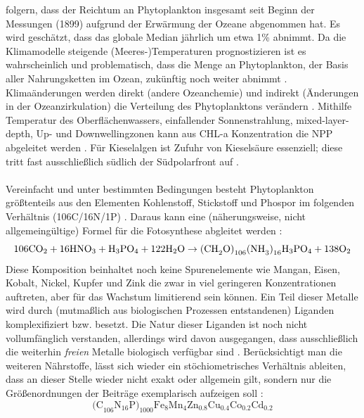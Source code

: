 \documentclass[12pt,a4paper,onecolumn]{scrartcl}
\newcommand{\cotwo}{CO\textsubscript{2}}
\begin{document}
\citet{Boyce.2010} folgern, dass der Reichtum an Phytoplankton insgesamt seit Beginn der Messungen (1899) aufgrund der Erwärmung der Ozeane abgenommen hat. Es wird geschätzt, dass das globale Median jährlich um etwa 1\% abnimmt. Da die Klimamodelle steigende (Meeres-)Temperaturen prognostizieren ist es wahrscheinlich und problematisch, dass die Menge an Phytoplankton, der Basis aller Nahrungsketten im Ozean, zukünftig noch weiter abnimmt \citep{Siegel.2010}. Klimaänderungen werden direkt (andere Ozeanchemie) und indirekt (Änderungen in der Ozeanzirkulation) die Verteilung des Phytoplanktons verändern \citep{Falkowski.1998}. Mithilfe Temperatur des Oberflächenwassers, einfallender Sonnenstrahlung, mixed-layer-depth, Up- und Downwellingzonen kann aus CHL-a Konzentration die NPP abgeleitet werden \citep{Falkowski.1998}. Für Kieselalgen ist Zufuhr von Kieselsäure essenziell; diese tritt fast ausschließlich südlich der Südpolarfront auf \citep{Falkowski.1998}.
\\\\
Vereinfacht und unter bestimmten Bedingungen besteht Phytoplankton größtenteils aus den Elementen Kohlenstoff, Stickstoff und Phospor im folgenden Verhältnis (106C/16N/1P) \citep{Falkowski.1998}. Daraus kann eine (näherungsweise, nicht allgemeingültige) Formel für die Fotosynthese abgleitet werden \citep{Emerson.2009}:
\begin{equation}
\text{106\cotwo} + \text{16HNO}_3 + \text{H}_3\text{PO}_4 + \text{122H}_2\text{O} \rightarrow \text{(CH}_2\text{O)}_{106}\text{(NH}_3\text{)}_{16}\text{H}_3\text{PO}_4 + \text{138O}_2
\end{equation}
Diese Komposition beinhaltet noch keine Spurenelemente wie Mangan, Eisen, Kobalt, Nickel, Kupfer und Zink die zwar in viel geringeren Konzentrationen auftreten, aber für das Wachstum limitierend sein können. Ein Teil dieser Metalle wird durch (mutmaßlich aus biologischen Prozessen entstandenen) Liganden komplexifiziert bzw. besetzt. Die Natur dieser Liganden ist noch nicht vollumfänglich verstanden, allerdings wird davon ausgegangen, dass ausschließlich die weiterhin \textit{freien} Metalle biologisch verfügbar sind \citep{Emerson.2009}. Berücksichtigt man die weiteren Nährstoffe, lässt sich wieder ein stöchiometrisches Verhältnis ableiten, dass an dieser Stelle wieder nicht exakt oder allgemein gilt, sondern nur die Größenordnungen der Beiträge exemplarisch aufzeigen soll \citep{Emerson.2009}:
\begin{equation}
\text{(C}_{106} \text{N}_{16} \text{P)}_{1000} \text{Fe}_8\text{Mn}_4\text{Zn}_{0.8}\text{Cu}_{0.4}\text{Co}_{0.2} \text{Cd}_{0.2}
\end{equation}
\end{document}
